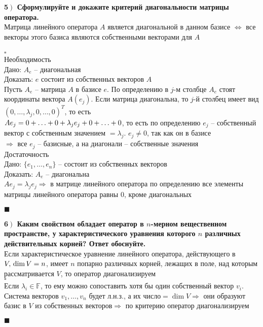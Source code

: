 \documentclass[a4paper,12pt]{article}
\newcommand*{\hm}[1]{#1\nobreak\discretionary{}
{\hbox{$\mathsurround=0pt #1$}}{}}
\begin{document}
    \textbf{5$\left.\right)$ Сформулируйте и докажите критерий диагональности матрицы оператора.}\\Матрица линейного оператора $A$ является диагональной в данном базисе $\Leftrightarrow$ все векторы этого базиса являются собственными векторами для $A$\\\\
    $\square$\\
    Необходимость\\
    Дано: $A_e$ -- диагональная\\
    Доказать: $e$ состоит из собственных векторов $A$\\
    Пусть $A_e$ -- матрица $A$ в базисе $e$. По определению в $j$-м столбце $A_e$ стоят координаты вектора $A(e_j)$. Если матрица диагональна, то $j$-й столбец имеет вид $(0, \ldots, \lambda_j, 0, \ldots, 0)^T$, то есть \\$Ae_j=0+\ldots+0\hm{+}\lambda_je_j+0+\ldots+0$, то есть по определению $e_j$ -- собственный вектор с собственным значением $=\lambda_j$. $e_j\ne 0$, так как он в базисе\\
    $\Rightarrow$ все $e_j$ -- базисные, а на диагонали -- собственные значения\\
    Достаточность\\
    Дано: $\{e_1, \ldots, e_n \}$ -- состоит из собственных векторов\\
    Доказать: $A_e$ -- диагональна\\
    $Ae_j=\lambda_je_j\Rightarrow$ в матрице линейного оператора по определению все элементы матрицы линейного оператора равны 0, кроме диагональных
    \begin{flushright}
        $\blacksquare$
    \end{flushright}

    \textbf{6$\left.\right)$ Каким свойством обладает оператор в $n$-мерном вещественном пространстве, у характеристического уравнения которого $n$ различных действительных корней? Ответ обоснуйте.}\\
    Если характеристическое уравнение линейного оператора, действующего в $V,\\ \dim V=n$, имеет $n$ попарно различных корней, лежащих в поле, над которым рассматривается $V$, то оператор диагонализируем\\
    $\square$\\
    Если $\lambda_i\in\mathbb{F}$, то ему можно сопоставить хотя бы один собственный вектор $v_i$. Система векторов $v_1, \ldots, v_n$ будет л.н.з., а их число$=\dim V\Rightarrow$ они образуют базис в $V$ из собственных векторов$\Rightarrow$ по критерию оператор диагонализируем
    \begin{flushright}
        $\blacksquare$
    \end{flushright}
\end{document}
